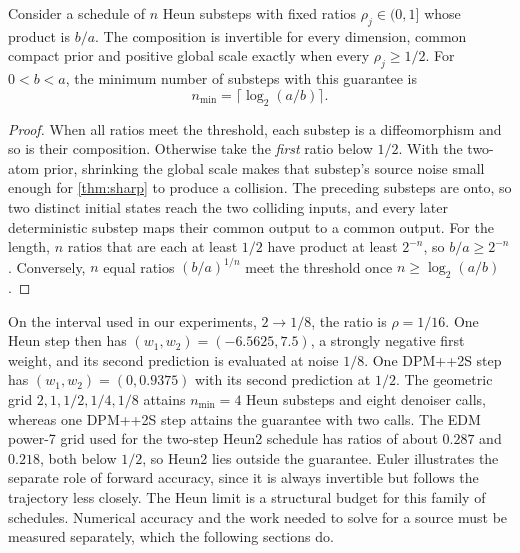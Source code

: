 \begin{corollary}
\label{cor:schedule}
Consider a schedule of $n$ Heun substeps with fixed ratios $\rho_j\in(0,1]$ whose product is $b/a$. The composition is invertible for every dimension, common compact prior and positive global scale exactly when every $\rho_j\ge1/2$. For $0<b<a$, the minimum number of substeps with this guarantee is
\begin{equation}
 n_{\min}=\big\lceil\log_2(a/b)\big\rceil.
 \label{eq:nmin}
\end{equation}
\end{corollary}
\begin{proof}
When all ratios meet the threshold, each substep is a diffeomorphism and so is their composition. Otherwise take the \emph{first} ratio below $1/2$. With the two-atom prior, shrinking the global scale makes that substep's source noise small enough for \cref{thm:sharp} to produce a collision. The preceding substeps are onto, so two distinct initial states reach the two colliding inputs, and every later deterministic substep maps their common output to a common output. For the length, $n$ ratios that are each at least $1/2$ have product at least $2^{-n}$, so $b/a\ge2^{-n}$. Conversely, $n$ equal ratios $(b/a)^{1/n}$ meet the threshold once $n\ge\log_2(a/b)$.
\end{proof}

On the interval used in our experiments, $2\to1/8$, the ratio is $\rho=1/16$. One Heun step then has $(w_1,w_2)=(-6.5625,7.5)$, a strongly negative first weight, and its second prediction is evaluated at noise $1/8$. One DPM++2S step has $(w_1,w_2)=(0,0.9375)$ with its second prediction at $1/2$. The geometric grid $2,1,1/2,1/4,1/8$ attains $n_{\min}=4$ Heun substeps and eight denoiser calls, whereas one DPM++2S step attains the guarantee with two calls. The EDM power-7 grid used for the two-step Heun2 schedule has ratios of about $0.287$ and $0.218$, both below $1/2$, so Heun2 lies outside the guarantee. Euler illustrates the separate role of forward accuracy, since it is always invertible but follows the trajectory less closely. The Heun limit is a structural budget for this family of schedules. Numerical accuracy and the work needed to solve for a source must be measured separately, which the following sections do.
